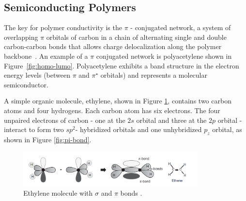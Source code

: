\subsection{Semiconducting Polymers}
\par
The key for polymer conductivity is the $\pi$ - conjugated network, a system of overlapping $\pi$ orbitals of carbon in a chain of alternating single and double carbon-carbon bonds that allows charge delocalization along the polymer backbone~\cite{heeger_polymers,Koehler_book,Casado_2021_book}. An example of a $\pi$ conjugated network is polyacetylene shown in Figure~\ref{fig:homo-lumo}. Polyacetylene exhibits a band structure in the electron energy levels (between $\pi$ and $\pi^\star$ orbitals) and represents a molecular semiconductor.\\
\par
A simple organic molecule, ethylene, shown in Figure \ref{fig:ethylene}, contains two carbon atoms and four hydrogens. Each carbon atom has six electrons. The four unpaired electrons of carbon - one at the $2s$ orbital and three at the $2p$ orbital - interact to form two $sp^2$- hybridized orbitals and one unhybridized $p_z$ orbital, as shown in Figure \ref{fig:pi-bond}. 

\begin{figure} [h]
\centering
\includegraphics[width = 0.85\textwidth]{./electrochemistry/figures/ethylene.png}
\caption{Ethylene molecule with $\sigma$ and $\pi$ bonds \cite{Koehler_book}.}
\label{fig:ethylene}
\end{figure}

